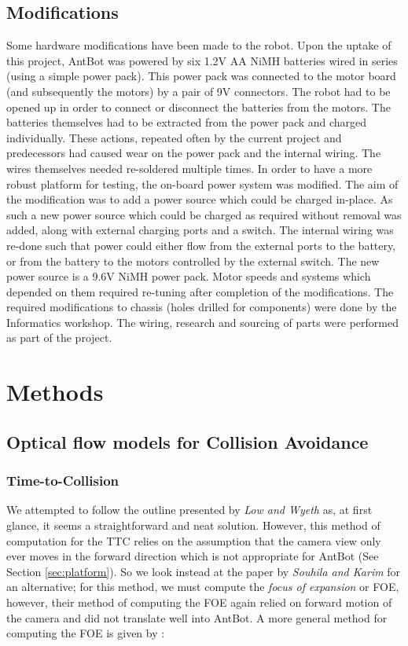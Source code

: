 \documentclass[a4paper,12pt]{article}
\begin{document}
\subsection{Modifications}
Some hardware modifications have been made to the robot. Upon the uptake of this project, AntBot
was powered by six 1.2V AA NiMH batteries wired in series (using a simple power pack). This power
pack was connected to the motor board (and subsequently the motors) by a pair of 9V connectors. The robot
had to be opened up in order to connect or disconnect the batteries from the motors. The batteries themselves
had to be extracted from the power pack and charged individually. These actions, repeated often by the current
project and predecessors had caused wear on the power pack and the internal wiring. The wires themselves
needed re-soldered multiple times. In order to have a more robust platform for testing, the on-board
power system was modified. The aim of the modification was to add a power source which could be charged in-place.
As such a new power source which could be charged as required without removal was added, along with external
charging ports and a switch. The internal wiring was re-done such that power could either flow from the
external ports to the battery, or from the battery to the motors controlled by the external switch. The new
power source is a 9.6V NiMH power pack. Motor speeds and systems which depended on them required re-tuning
after completion of the modifications. The required modifications to chassis (holes drilled for components)
were done by the Informatics workshop. The wiring, research and sourcing of parts were performed as part
of the project.
\newpage

\section{ Methods } \label{sec:methods}
\subsection{Optical flow models for Collision Avoidance}
\subsubsection{Time-to-Collision}
We attempted to follow the outline presented by \textit{Low and Wyeth} as, at first glance, it seems
a straightforward and neat solution. However, this method of computation for the TTC relies on the
assumption that the camera view only ever moves in the forward direction which is not appropriate
for AntBot (See Section \ref{sec:platform}). So we look instead at the paper by \textit{Souhila and Karim}
for an alternative; for this method, we must compute the \textit{focus of expansion} or FOE, however,
their method of computing the FOE again relied on forward motion of the camera and did not translate
well into AntBot. A more general method for computing the FOE is given by \cite{ODonovan2005}:
\end{document}
